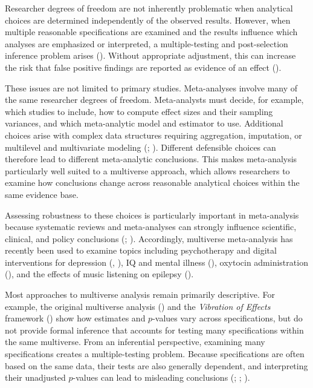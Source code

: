 \documentclass[
  man,
  longtable,
  nolmodern,
  notxfonts,
  notimes,
  colorlinks=true,linkcolor=blue,citecolor=blue,urlcolor=blue]{apa7}
\begin{document}
Researcher degrees of freedom are not inherently problematic when
analytical choices are determined independently of the observed results.
However, when multiple reasonable specifications are examined and the
results influence which analyses are emphasized or interpreted, a
multiple-testing and post-selection inference problem arises
(). Without
appropriate adjustment, this can increase the risk that false positive
findings are reported as evidence of an effect
().

These issues are not limited to primary studies. Meta-analyses involve
many of the same researcher degrees of freedom. Meta-analysts must
decide, for example, which studies to include, how to compute effect
sizes and their sampling variances, and which meta-analytic model and
estimator to use. Additional choices arise with complex data structures
requiring aggregation, imputation, or multilevel and multivariate
modeling (;
). Different defensible choices can therefore lead to different
meta-analytic conclusions. This makes meta-analysis particularly well
suited to a multiverse approach, which allows researchers to examine how
conclusions change across reasonable analytical choices within the same
evidence base.

Assessing robustness to these choices is particularly important in
meta-analysis because systematic reviews and meta-analyses can strongly
influence scientific, clinical, and policy conclusions
(;
). Accordingly,
multiverse meta-analysis has recently been used to examine topics
including psychotherapy and digital interventions for depression
(,
), IQ and mental illness
(), oxytocin
administration (), and the
effects of music listening on epilepsy
().

Most approaches to multiverse analysis remain primarily descriptive. For
example, the original multiverse analysis
() and the
\emph{Vibration of Effects} framework () show how estimates and \(p\)-values vary across
specifications, but do not provide formal inference that accounts for
testing many specifications within the same multiverse. From an
inferential perspective, examining many specifications creates a
multiple-testing problem. Because specifications are often based on the
same data, their tests are also generally dependent, and interpreting
their unadjusted \(p\)-values can lead to misleading conclusions
(;
;
).
\end{document}

